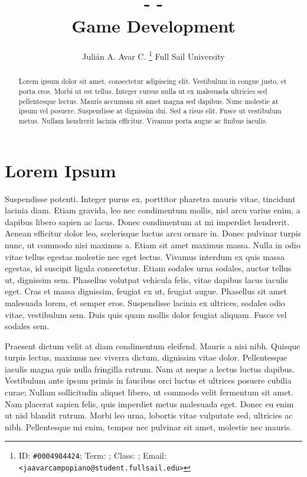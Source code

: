\documentclass[10pt, letterpaper]{article}
\title{
	 -  - \\
 	\large Game Development
}
\author{
	Julián A. Avar C. \thanks{
		ID: \texttt{\#0004984424};
		Term: \texttt{};
		Class: \texttt{};
		Email: \texttt{<jaavarcampopiano@student.fullsail.edu>}
	} \authorcr
	Full Sail University
}
\theoremstyle{definition}
\begin{document}
	\maketitle
	
	\begin{abstract}
		Lorem \autocite{name} ipsum dolor sit amet, consectetur adipiscing elit. Vestibulum in congue justo, et porta eros. Morbi ut est tellus. Integer cursus nulla ut ex malesuada ultricies sed pellentesque lectus. Mauris accumsan sit amet magna sed dapibus. Nunc molestie at ipsum vel posuere. Suspendisse at dignissim dui. Sed a risus elit. Fusce ut vestibulum metus. Nullam hendrerit lacinia efficitur. Vivamus porta augue ac finibus iaculis.
	\end{abstract}

	
	\section{Lorem Ipsum}
	
	
	Suspendisse potenti. Integer purus ex, porttitor pharetra mauris vitae, tincidunt lacinia diam. Etiam gravida, leo nec condimentum mollis, nisl arcu varius enim, a dapibus libero sapien ac lacus. Donec condimentum at mi imperdiet hendrerit. Aenean efficitur dolor leo, scelerisque luctus arcu ornare in. Donec pulvinar turpis nunc, ut commodo nisi maximus a. Etiam sit amet maximus massa. Nulla in odio vitae tellus egestas molestie nec eget lectus. Vivamus interdum ex quis massa egestas, id suscipit ligula consectetur. Etiam sodales urna sodales, auctor tellus ut, dignissim sem. Phasellus volutpat vehicula felis, vitae dapibus lacus iaculis eget. Cras et massa dignissim, feugiat ex ut, feugiat augue. Phasellus sit amet malesuada lorem, et semper eros. Suspendisse lacinia ex ultrices, sodales odio vitae, vestibulum sem. Duis quis quam mollis dolor feugiat aliquam. Fusce vel sodales sem.
	
	Praesent dictum velit at diam condimentum eleifend. Mauris a nisi nibh. Quisque turpis lectus, maximus nec viverra dictum, dignissim vitae dolor. Pellentesque iaculis magna quis nulla fringilla rutrum. Nam at neque a lectus luctus dapibus. Vestibulum ante ipsum primis in faucibus orci luctus et ultrices posuere cubilia curae; Nullam sollicitudin aliquet libero, ut commodo velit fermentum sit amet. Nam placerat sapien felis, quis imperdiet metus malesuada eget. Donec eu enim ut nisl blandit rutrum. Morbi leo urna, lobortis vitae vulputate sed, ultricies ac nibh. Pellentesque mi enim, tempor nec pulvinar sit amet, molestie nec mauris. 
	
	\clearpage
	
	
	\printbibliography[title = {Bibliography}]
	
	\tableofcontents
	
\end{document}
